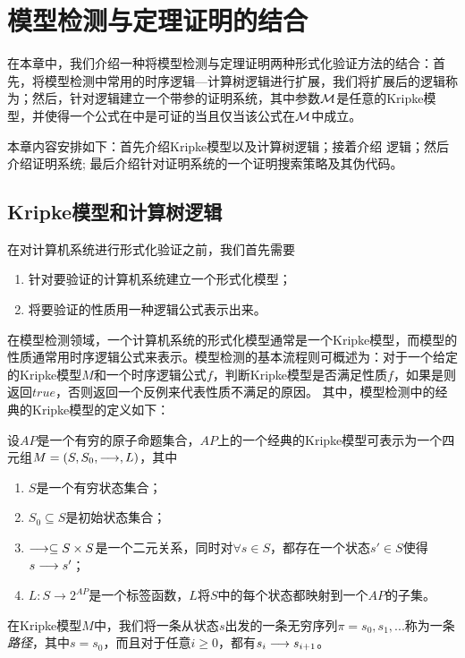 \chapter{模型检测与定理证明的结合}\label{chapt:sctl}
在本章中，我们介绍一种将模型检测与定理证明两种形式化验证方法的结合：首先，将模型检测中常用的时序逻辑---计算树逻辑\CTL{}进行扩展，我们将扩展后的逻辑称为\CTLP{}；然后，针对\CTLP{}逻辑建立一个带参的证明系统\sctlm{}，其中参数$\cal M$是任意的Kripke模型，并使得一个\CTLP{}公式在\sctlm{}中是可证的当且仅当该公式在$\cal M$中成立。

本章内容安排如下：首先介绍Kripke模型以及计算树逻辑\CTL{}；接着介绍\CTLP{} 逻辑；然后介绍证明系统\SCTL{}; 最后介绍针对证明系统\SCTL{}的一个证明搜索策略及其伪代码。

\section{Kripke模型和计算树逻辑\CTL{}}
在对计算机系统进行形式化验证之前，我们首先需要
\begin{enumerate}
	\item 针对要验证的计算机系统建立一个形式化模型；
	\item 将要验证的性质用一种逻辑公式表示出来。
\end{enumerate}
在模型检测领域，一个计算机系统的形式化模型通常是一个Kripke模型，而模型的性质通常用时序逻辑公式来表示。模型检测的基本流程则可概述为：对于一个给定的Kripke模型$M$和一个时序逻辑公式$f$，判断Kripke模型是否满足性质$f$，如果是则返回$true$，否则返回一个反例来代表性质不满足的原因。
其中，模型检测中的经典的Kripke模型的定义如下：
\begin{definition}[经典的Kripke模型]
	设$AP$是一个有穷的原子命题集合，$AP$上的一个经典的Kripke模型可表示为一个四元组$M=(S,S_0,\longrightarrow,L)$，其中
	\begin{enumerate}
		\item $S$是一个有穷状态集合；
		\item $S_0\subseteq S$是初始状态集合；
		\item $\longrightarrow\subseteq S\times S$是一个二元关系，同时对$\forall s\in S$，都存在一个状态$s'\in S$使得$s\longrightarrow s'$；
		\item $L:S\rightarrow 2^{AP}$是一个标签函数，$L$将$S$中的每个状态都映射到一个$AP$的子集。
	\end{enumerate}
\end{definition}
在Kripke模型$M$中，我们将一条从状态$s$出发的一条无穷序列$\pi=s_0,s_1,...$称为一条\textit{路径}，其中$s=s_0$，而且对于任意$i\ge 0$，都有$s_i\longrightarrow s_{i+1}$。

